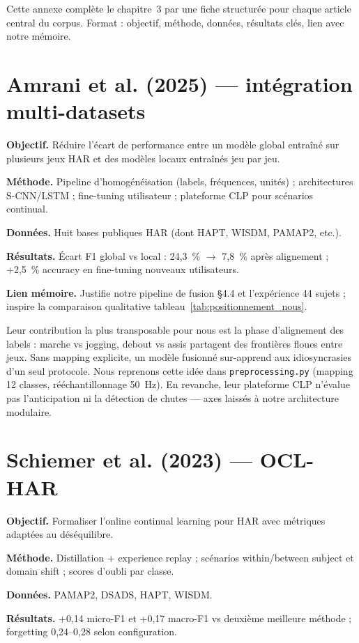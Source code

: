 \documentclass[a4paper,12pt]{report}
\begin{document}
Cette annexe complète le chapitre~3 par une fiche structurée pour chaque article
central du corpus. Format : objectif, méthode, données, résultats clés, lien avec
notre mémoire.

\section{Amrani et al. (2025) — intégration multi-datasets}

\textbf{Objectif.} Réduire l'écart de performance entre un modèle global entraîné
sur plusieurs jeux HAR et des modèles locaux entraînés jeu par jeu.

\textbf{Méthode.} Pipeline d'homogénéisation (labels, fréquences, unités) ;
architectures S-CNN/LSTM ; fine-tuning utilisateur ; plateforme CLP pour scénarios
continual.

\textbf{Données.} Huit bases publiques HAR (dont HAPT, WISDM, PAMAP2, etc.).

\textbf{Résultats.} Écart F1 global vs local : 24,3~\% $\rightarrow$ 7,8~\% après
alignement ; +2,5~\% accuracy en fine-tuning nouveaux utilisateurs.

\textbf{Lien mémoire.} Justifie notre pipeline de fusion §4.4 et l'expérience
44 sujets ; inspire la comparaison qualitative tableau~\ref{tab:positionnement_nous}.

Leur contribution la plus transposable pour nous est la phase d'alignement des
labels : marche vs jogging, debout vs assis partagent des frontières floues
entre jeux. Sans mapping explicite, un modèle fusionné sur-apprend aux idiosyncrasies
d'un seul protocole. Nous reprenons cette idée dans \texttt{preprocessing.py}
(mapping 12 classes, rééchantillonnage 50~Hz). En revanche, leur plateforme CLP
n'évalue pas l'anticipation ni la détection de chutes — axes laissés à notre
architecture modulaire.

\section{Schiemer et al. (2023) — OCL-HAR}

\textbf{Objectif.} Formaliser l'online continual learning pour HAR avec métriques
adaptées au déséquilibre.

\textbf{Méthode.} Distillation + experience replay ; scénarios within/between
subject et domain shift ; scores d'oubli par classe.

\textbf{Données.} PAMAP2, DSADS, HAPT, WISDM.

\textbf{Résultats.} +0,14 micro-F1 et +0,17 macro-F1 vs deuxième meilleure méthode ;
forgetting 0,24--0,28 selon configuration.
\end{document}
